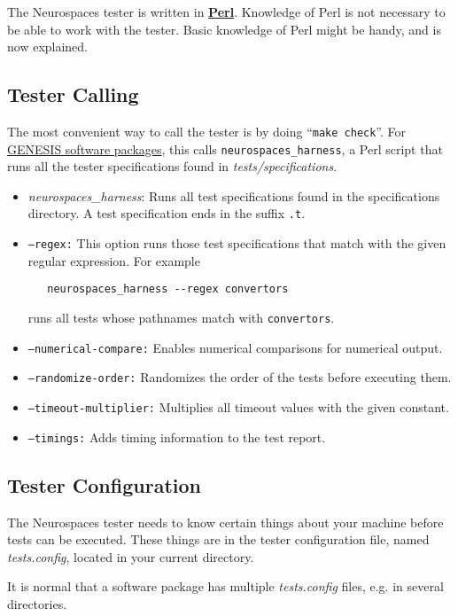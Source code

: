 \documentclass[12pt]{article}
\begin{document}
The Neurospaces tester is written in \href{http://www.perl.org/}{\bf Perl}. Knowledge of Perl is not necessary to be able to work with the tester. Basic knowledge of Perl might be handy, and is now explained.

\subsection*{Tester Calling}

The most convenient way to call the tester is by doing ``{\tt make
  check}''. For
\href{../genesis-components/genesis-components.tex}{GENESIS software
  packages}, this calls {\tt neurospaces\_harness}, a Perl script that
runs all the tester specifications found in {\it
  tests/specifications}.

\begin{itemize}
\item {\it neurospaces\_harness}: Runs all test specifications found in the specifications directory. A test specification ends in the suffix {\tt .t}.
\item {\tt --regex:} This option runs those test specifications that match with the given regular expression. For example
\begin{verbatim}
   neurospaces_harness --regex convertors
\end{verbatim}
runs all tests whose pathnames match with {\tt convertors}.
\item {\tt --numerical-compare:} Enables numerical comparisons for numerical output.
\item {\tt --randomize-order:} Randomizes the order of the tests before executing them.
\item {\tt --timeout-multiplier:} Multiplies all timeout values with the given constant.
\item {\tt --timings:} Adds timing information to the test report.
\end{itemize}
    
\subsection*{Tester Configuration}

The Neurospaces tester needs to know certain things about your machine before tests can be executed. These things are in the tester configuration file, named {\it tests.config}, located in your current directory.

It is normal that a software package has multiple {\it tests.config} files, e.g. in several directories.
\end{document}
